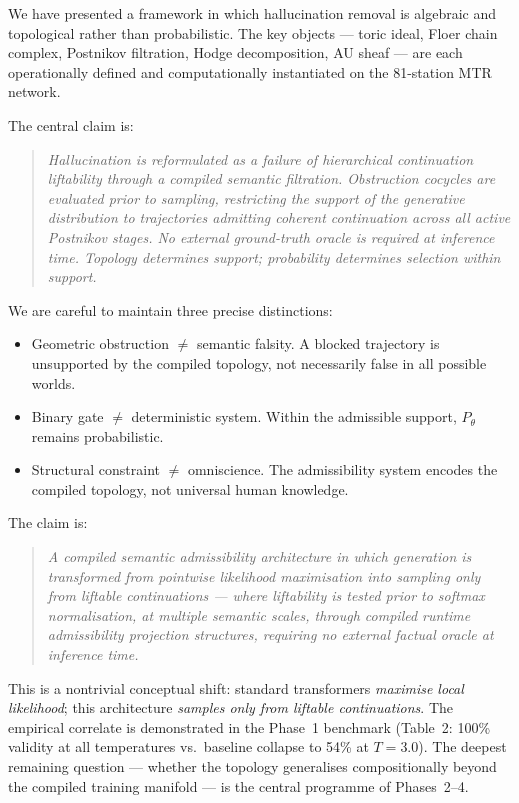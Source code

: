 \documentclass[11pt,a4paper]{article}
\begin{document}
We have presented a framework in which hallucination removal
is algebraic and topological rather than probabilistic.
The key objects --- toric ideal, Floer chain complex, Postnikov
filtration, Hodge decomposition, AU sheaf --- are each
operationally defined and computationally instantiated on the
81-station MTR network.

The central claim is:

\begin{quote}
\emph{Hallucination is reformulated as a failure of hierarchical
continuation liftability through a compiled semantic filtration.
Obstruction cocycles are evaluated prior to sampling, restricting the
support of the generative distribution to trajectories admitting
coherent continuation across all active Postnikov stages.
No external ground-truth oracle is required at inference time.
Topology determines support; probability determines selection within
support.}
\end{quote}

\noindent
We are careful to maintain three precise distinctions:
\begin{itemize}
  \item Geometric obstruction $\neq$ semantic falsity.
        A blocked trajectory is unsupported by the compiled topology,
        not necessarily false in all possible worlds.
  \item Binary gate $\neq$ deterministic system.
        Within the admissible support, $P_\theta$ remains probabilistic.
  \item Structural constraint $\neq$ omniscience.
        The admissibility system encodes the compiled topology,
        not universal human knowledge.
\end{itemize}
The claim is:

\begin{quote}
\emph{A compiled semantic admissibility architecture in which
generation is transformed from pointwise likelihood maximisation
into sampling only from liftable continuations --- where
liftability is tested prior to softmax normalisation, at multiple
semantic scales, through compiled runtime admissibility projection
structures, requiring no external factual oracle at inference time.}
\end{quote}

\noindent
This is a nontrivial conceptual shift:
standard transformers \emph{maximise local likelihood};
this architecture \emph{samples only from liftable continuations}.
The empirical correlate is demonstrated in the Phase~1 benchmark
(Table~2: 100\% validity at all temperatures vs.\ baseline collapse
to 54\% at $T=3.0$).
The deepest remaining question --- whether the topology generalises
compositionally beyond the compiled training manifold --- is
the central programme of Phases~2--4.
\end{document}
